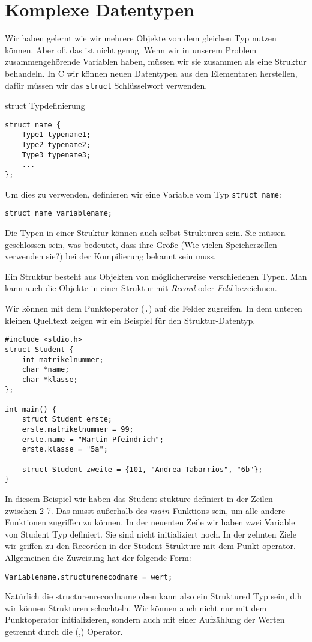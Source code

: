 \section{Komplexe Datentypen}

Wir haben gelernt wie wir mehrere Objekte von dem gleichen Typ nutzen
können. Aber oft das ist nicht genug. Wenn wir in unserem Problem
zusammengehörende Variablen haben, müssen wir sie zusammen 
als eine Struktur behandeln. In C wir können neuen Datentypen aus
den Elementaren herstellen, dafür müssen wir das \texttt{struct} Schlüsselwort
verwenden.

\begin{myalertblock}{struct Typdefinierung}
\begin{lstlisting}
struct name {
    Type1 typename1;
    Type2 typename2;
    Type3 typename3;
    ...
};
\end{lstlisting}

Um dies zu verwenden, definieren wir eine Variable vom Typ \texttt{struct name}:

\begin{lstlisting}
struct name variablename;
\end{lstlisting}

Die Typen in einer Struktur können auch selbst Strukturen sein.
Sie müssen geschlossen sein, was bedeutet, dass ihre Größe
(Wie vielen Speicherzellen verwenden sie?) bei der Kompilierung
bekannt sein muss.
\end{myalertblock}

Ein Struktur besteht aus Objekten von möglicherweise verschiedenen Typen. Man
kann auch die Objekte in einer Struktur mit \emph{Record} oder \emph{Feld}
bezeichnen.

Wir können mit dem Punktoperator (\texttt{.}) auf die Felder zugreifen. In dem
unteren kleinen Quelltext zeigen wir ein Beispiel für den Struktur-Datentyp.

\begin{lstlisting}
#include <stdio.h>
struct Student {
    int matrikelnummer;
    char *name;
    char *klasse;
};

int main() {
    struct Student erste;
    erste.matrikelnummer = 99;
    erste.name = "Martin Pfeindrich";
    erste.klasse = "5a";

    struct Student zweite = {101, "Andrea Tabarrios", "6b"};
}
\end{lstlisting}

In diesem Beispiel wir haben das Student stukture definiert in der Zeilen zwischen 2-7.
Das musst außerhalb des $main$ Funktions sein, um alle andere Funktionen zugriffen zu können.
In der neuenten Zeile wir haben zwei Variable von Student Typ definiert. Sie sind 
nicht initializiert noch. In der zehnten Ziele wir griffen zu den Recorden in der
Student Strukture mit dem Punkt operator. Allgemeinen die Zuweisung hat der folgende Form:
\begin{lstlisting}
Variablename.structurenecodname = wert;
\end{lstlisting}
Natürlich die structurenrecordname oben kann also ein Struktured Typ sein, d.h wir können
Strukturen schachteln. Wir können auch nicht nur mit dem Punktoperator initializieren, sondern
auch mit einer Aufzählung der Werten getrennt durch die (,) Operator.

